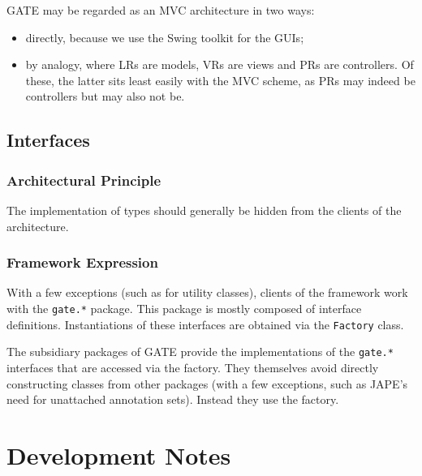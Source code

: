 GATE may be regarded as an MVC architecture in two ways:
\begin{itemize}
\item 
directly, because we use the Swing toolkit for the GUIs;
\item 
by analogy, where LRs are models, VRs are views and PRs are controllers.
Of these, the latter sits least
easily with the MVC scheme, as PRs may indeed be controllers but may also
not be.
\end{itemize}

\subsection{Interfaces}

\label{f0:interfaces}%

\subsubsection{Architectural Principle}


The implementation of types should generally be hidden from the clients of
the architecture.

\subsubsection{Framework Expression}


With a few exceptions (such as for utility classes),
clients of the framework work with the {\tt gate.*} package.
This
package is mostly composed of interface definitions.
Instantiations of these interfaces are obtained via the {\tt Factory}
class.

The subsidiary packages of GATE provide the implementations of the
{\tt gate.*} interfaces that are accessed via the factory. They
themselves avoid directly constructing classes from other packages
(with a few exceptions, such as JAPE's need for unattached annotation
sets). Instead they use the factory.


\section{Development Notes}

